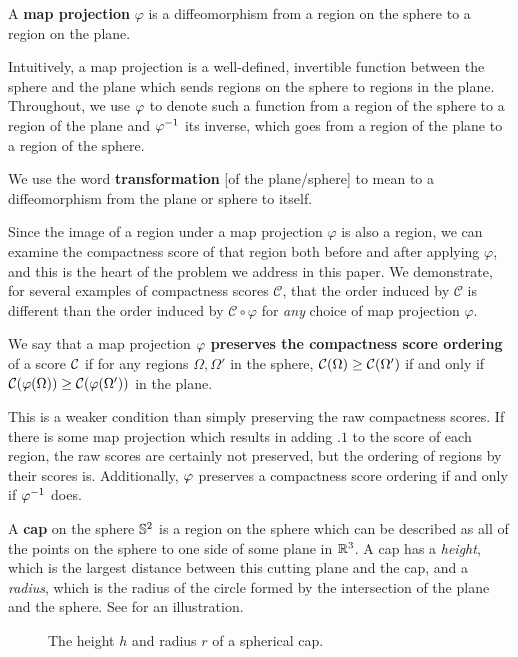 \begin{definition}
  A \textbf{map projection} $\varphi$ is a 
  diffeomorphism from a region on the sphere to a region on the 
  plane. 
\end{definition}

Intuitively, a map projection is a well-defined, invertible function between the sphere and the plane which sends regions on the sphere to regions in the plane.  Throughout, we use $\varphi$ to denote such a function from a region of the sphere 
to a region of the plane and $\varphi^{-1}$ its inverse, which goes from a region of the plane to a region of the sphere. 

\begin{definition}
  We use the word \textbf{transformation} [of the plane/sphere] to mean
  to a diffeomorphism from the plane or sphere to itself.
\end{definition}

Since the image of a region under a map projection $\varphi$ is also
a region, we can examine the compactness score of that region both 
before and after applying $\varphi$, and this is the heart of the
problem we address in this paper.  We demonstrate, for several
examples of compactness scores $\mathcal{C}$, that the order
induced by $\mathcal{C}$ is different than the order induced by
$\mathcal{C}\circ\varphi$ for \textit{any} choice of map projection
$\varphi$.

\begin{definition}
  We say that a map projection $\varphi$ \textbf{preserves the  
  compactness score ordering} of a score $\mathcal{C}$ if for any regions 
  $\Omega,\Omega'$ in the sphere, $\mathcal{C}(\Omega)\ge \mathcal{C}(\Omega')$ 
  if and only if $\mathcal{C}(\varphi(\Omega)) \ge \mathcal{C}(\varphi(\Omega'))$ in the plane.
\end{definition}

   This is a weaker condition than simply preserving the raw compactness scores. 
   If there is some map projection which results in adding $.1$ to the score of each region, the raw scores are certainly not preserved, but the ordering of regions by their scores is. Additionally, $\varphi$ preserves a compactness score ordering 
  if and only if $\varphi^{-1}$ does.


\begin{definition}
  A 
  \textbf{cap} on the sphere  $\mathbb{S}^2$ is a region on the sphere
 which can be described as all of the points on the sphere to one side of some plane 
 in $\mathbb{R}^3$.  A cap has a \textit{height}, which is the largest distance between this cutting plane and the cap, and a \textit{radius}, which is the radius of the circle formed by the intersection of the plane and the sphere.  See  for an illustration.
\end{definition}


\begin{figure}[h]
  \centering
  
  \caption{ The height $h$ and radius $r$ of a spherical cap. }
  \label{fig:caphr}
\end{figure}





